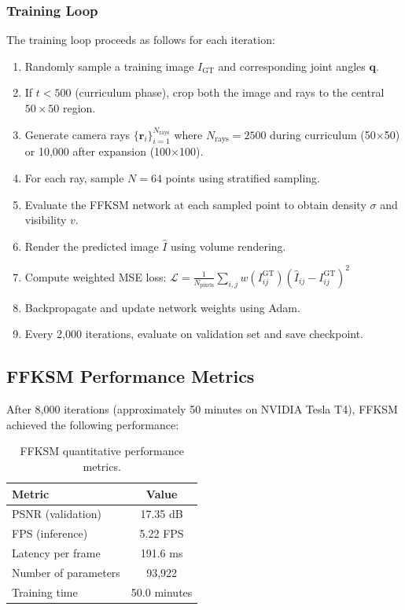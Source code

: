 \documentclass[12pt,a4paper,oneside]{report}
\begin{document}
\subsubsection{Training Loop}

The training loop proceeds as follows for each iteration:

\begin{enumerate}
    \item Randomly sample a training image $I_{\text{GT}}$ and corresponding joint angles $\mathbf{q}$.
    \item If $t < 500$ (curriculum phase), crop both the image and rays to the central $50 \times 50$ region.
    \item Generate camera rays $\{\mathbf{r}_i\}_{i=1}^{N_{\text{rays}}}$ where $N_{\text{rays}} = 2500$ during curriculum (50×50) or 10,000 after expansion (100×100).
    \item For each ray, sample $N=64$ points using stratified sampling.
    \item Evaluate the FFKSM network at each sampled point to obtain density $\sigma$ and visibility $v$.
    \item Render the predicted image $\hat{I}$ using volume rendering.
    \item Compute weighted MSE loss: $\mathcal{L} = \frac{1}{N_{\text{pixels}}} \sum_{i,j} w(I_{ij}^{\text{GT}}) (\hat{I}_{ij} - I_{ij}^{\text{GT}})^2$
    \item Backpropagate and update network weights using Adam.
    \item Every 2,000 iterations, evaluate on validation set and save checkpoint.
\end{enumerate}

\subsection{FFKSM Performance Metrics}

After 8,000 iterations (approximately 50 minutes on NVIDIA Tesla T4), FFKSM achieved the following performance:

\begin{table}[H]
\centering
\caption{FFKSM quantitative performance metrics.}
\label{tab:ffksm_performance}
\begin{tabular}{lc}
\toprule
Metric & Value \\
\midrule
PSNR (validation) & 17.35 dB \\
FPS (inference) & 5.22 FPS \\
Latency per frame & 191.6 ms \\
Number of parameters & 93,922 \\
Training time & 50.0 minutes \\
\bottomrule
\end{tabular}
\end{table}
\end{document}
